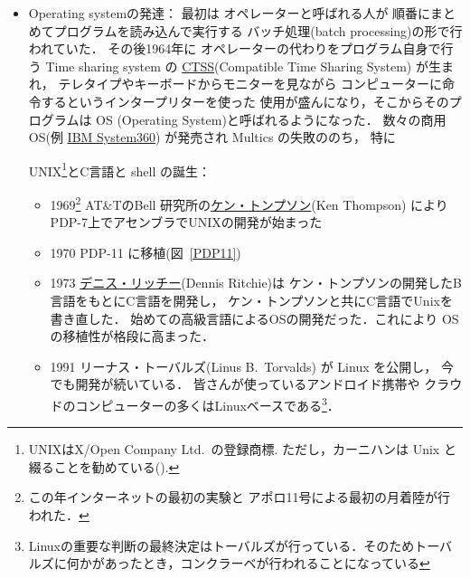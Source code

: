 \begin{itemize}
   \item 
      Operating systemの発達：
      最初は
      オペレーターと呼ばれる人が
      順番にまとめてプログラムを読み込んで実行する
      バッチ処理(batch processing)の形で行われていた．
      その後1964年に
      オペレーターの代わりをプログラム自身で行う
      Time sharing system の
      \href{https://www.youtube.com/watch?v=Q07PhW5sCEk&list=PLT8Ms9NT2xpb6yBvtVpBXzUoIMAhDu0G9}
      {CTSS}(Compatible Time Sharing System) が生まれ，
      テレタイプやキーボードからモニターを見ながら
      コンピューターに命令するというインタープリターを使った
      使用が盛んになり，そこからそのプログラムは
      OS (Operating System)と呼ばれるようになった．
      数々の商用OS(例
      \href{https://www.youtube.com/watch?v=npgvV_-Nh60}{IBM System360})
      が発売され
      Multics の失敗ののち，
      特に
      
      UNIX\footnote{UNIXはX/Open Company Ltd.~の登録商標. ただし，カーニハンは Unix と綴ることを勧めている(\cite{K}).}とC言語と shell の誕生：
      \begin{itemize}
         \item
            1969\footnote{この年インターネットの最初の実験と
            アポロ11号による最初の月着陸が行われた．} %
            AT\&TのBell 研究所の\href{https://www.youtube.com/watch?v=HADp3emVABg&t=302s}{ケン・トンプソン}(Ken Thompson)
             によりPDP-7上でアセンブラでUNIXの開発が始まった
         \item
            1970 PDP-11 に移植(図~\ref{PDP11})
         \item
            1973 \href{https://www.youtube.com/watch?v=RaotHMNZPaI}
            {デニス・リッチー}(Dennis Ritchie)は
            ケン・トンプソンの開発したB言語をもとにC言語を開発し，
            ケン・トンプソンと共にC言語でUnixを書き直した．
            始めての高級言語によるOSの開発だった．これにより
            OSの移植性が格段に高まった．
            
          \item
            1991 リーナス・トーバルズ(Linus B.~Torvalds) が Linux を公開し，
            今でも開発が続いている．
            皆さんが使っているアンドロイド携帯や
            クラウドのコンピューターの多くはLinuxベースである\footnote{Linuxの重要な判断の最終決定はトーバルズが行っている．そのためトーバルズに何かがあったとき，コンクラーベが行われることになっている}．
            

      \end{itemize}
      

\end{itemize}
